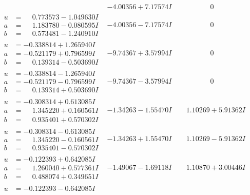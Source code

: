 \documentclass[1p]{elsarticle_modified}
\theoremstyle{definition}
\begin{document}
$$\begin{array}{c|c|c}
 & -4.00356 + 7.17574 I & \phantom{-0.000000 } 0 \\ \hline\begin{aligned}
u &= \phantom{-}0.773573 - 1.049630 I \\
a &= \phantom{-}1.183780 - 0.080595 I \\
b &= \phantom{-}0.573481 - 1.240910 I\end{aligned}
 & -4.00356 - 7.17574 I & \phantom{-0.000000 } 0 \\ \hline\begin{aligned}
u &= -0.338814 + 1.265940 I \\
a &= -0.521179 + 0.796599 I \\
b &= \phantom{-}0.139314 - 0.503690 I\end{aligned}
 & -9.74367 + 3.57994 I & \phantom{-0.000000 } 0 \\ \hline\begin{aligned}
u &= -0.338814 - 1.265940 I \\
a &= -0.521179 - 0.796599 I \\
b &= \phantom{-}0.139314 + 0.503690 I\end{aligned}
 & -9.74367 - 3.57994 I & \phantom{-0.000000 } 0 \\ \hline\begin{aligned}
u &= -0.308314 + 0.613085 I \\
a &= \phantom{-}1.345220 + 0.160561 I \\
b &= \phantom{-}0.935401 + 0.570302 I\end{aligned}
 & -1.34263 - 1.55470 I & \phantom{-}1.10269 + 5.91362 I \\ \hline\begin{aligned}
u &= -0.308314 - 0.613085 I \\
a &= \phantom{-}1.345220 - 0.160561 I \\
b &= \phantom{-}0.935401 - 0.570302 I\end{aligned}
 & -1.34263 + 1.55470 I & \phantom{-}1.10269 - 5.91362 I \\ \hline\begin{aligned}
u &= -0.122393 + 0.642085 I \\
a &= \phantom{-}1.260040 + 0.577361 I \\
b &= \phantom{-}0.488074 + 0.349651 I\end{aligned}
 & -1.49067 - 1.69118 I & \phantom{-}1.10870 + 3.00446 I \\ \hline\begin{aligned}
u &= -0.122393 - 0.642085 I \\

\end{aligned}
\end{array}$$
\end{document}
